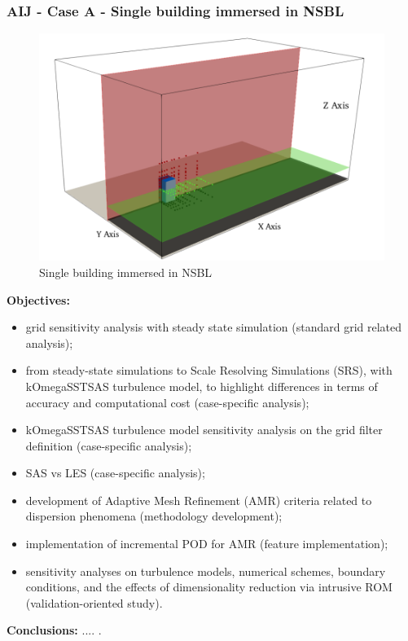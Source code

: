 \subsubsection{AIJ - Case A - Single building immersed in NSBL}
    \begin{figure}[h!]
        \centering
        \hypertarget{link:aij_A}{}
        \includegraphics[scale=0.6]{imgs/aij_A.png}
        \caption{Single building immersed in NSBL}
    \end{figure}
    \textbf{Objectives:} 
    \begin{itemize}
        \item grid sensitivity analysis with steady state simulation (standard grid related analysis);
        \item from steady-state simulations to Scale Resolving Simulations (SRS), with kOmegaSSTSAS turbulence model, to highlight differences in terms of accuracy and computational cost (case-specific analysis);
        \item kOmegaSSTSAS turbulence model sensitivity analysis on the grid filter definition (case-specific analysis);
        \item SAS vs LES (case-specific analysis);
        \item development of Adaptive Mesh Refinement (AMR) criteria related to dispersion phenomena (methodology development);
        \item implementation of incremental POD for AMR (feature implementation);
        \item sensitivity analyses on turbulence models, numerical schemes, boundary conditions, and the effects of dimensionality reduction via intrusive ROM (validation-oriented study).
    \end{itemize}
    \textbf{Conclusions:} .... .\newline
